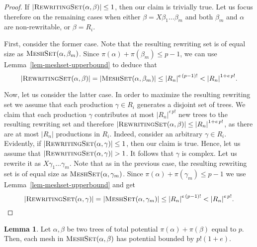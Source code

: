 \documentclass[11pt,a4paper]{amsart}
\theoremstyle{definition}
\newtheorem{lemma}[theorem]{Lemma}
\newcommand{\RewritingSet}[2]{\textsc{RewritingSet}(#1,#2)}
\newcommand{\MeshSet}[2]{\textsc{MeshSet}(#1,#2)}
\newcommand{\potential}[1]{\pi(#1)}
\begin{document}
\begin{proof}
	If $|\RewritingSet{\alpha}{\beta}| \leq 1$, then our claim is trivially true. Let us focus therefore on the remaining cases when either $\beta = X \beta_1 \ldots \beta_m$ and both $\beta_m$ and $\alpha$ are non-rewritable, or $\beta = R_i$. 
	
	First, consider the former case. Note that the resulting rewriting set is of equal size as
    $\MeshSet{\alpha}{\beta_m}$. Since $\potential{\alpha} + \potential{\beta_m}
    \leq p - 1$, we can use Lemma~\ref{lem-meshset-upperbound} to deduce that
    \[ |\RewritingSet{\alpha}{\beta}| = |\MeshSet{\alpha}{\beta_m}| \leq  {|R_n|}^{e\, (p-1)!} < {|R_n|}^{1 + e\, p!}.\]
	
	Now, let us consider the latter case. In order to maximize
    the resulting rewriting set we assume that each production $\gamma \in
    R_i$ generates a disjoint set of trees. We claim that each production
     $\gamma$ contributes at most ${|R_n|}^{e\, p!}$ new trees to the resulting
      rewriting set and therefore $|\RewritingSet{\alpha}{\beta}| \leq {|R_n|}^{1 + e\, p!}$, as there are at most $|R_n|$ productions in $R_i$. Indeed, consider an arbitrary $\gamma \in R_i$. Evidently, if $|\RewritingSet{\alpha}{\gamma}| \leq 1$, then our claim is true. Hence, let us assume that $|\RewritingSet{\alpha}{\gamma}| > 1$. It follows that $\gamma$ is complex. Let us rewrite it as $X \gamma_1 \ldots \gamma_m$. Note that as in the previous case, the resulting rewriting set is of equal size as $\MeshSet{\alpha}{\gamma_m}$. Since $\potential{\alpha} + \potential{\gamma_m} \leq p - 1$ we use Lemma~\ref{lem-meshset-upperbound} and get
      \[ |\RewritingSet{\alpha}{\gamma}| = |\MeshSet{\alpha}{\gamma_m}| \leq  {|R_n|}^{e\, (p-1)!} < {|R_n|}^{e\, p!}.\]
\end{proof}

\begin{lemma}\label{lem-meshset-potential-upperbound}
    Let $\alpha,\beta$ be two trees of total potential
    $\potential{\alpha} + \potential{\beta}$ equal to $p$. Then, each mesh in
    $\MeshSet{\alpha}{\beta}$ has potential bounded by $p! (1 + e)$.
\end{lemma}
\end{document}
